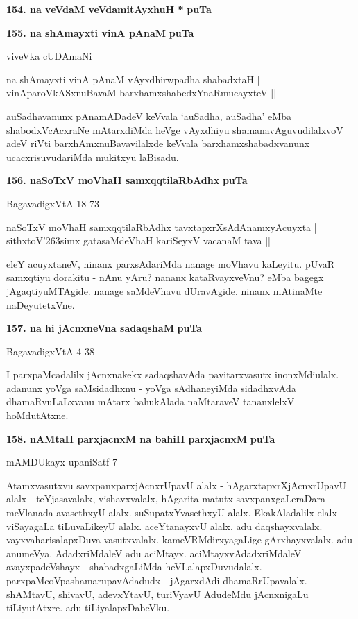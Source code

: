 \medskip
\noindent
\textbf{154. na veVdaM veVdamitAyxhuH *} \hfill{\bf puTa \pageref{132}}

\medskip
\noindent
\textbf{155. na shAmayxti vinA pAnaM} \hfill{\bf puTa \pageref{25}}

\hfill{viveVka cUDAmaNi}

\begin{shloka}
na shAmayxti vinA pAnaM vAyxdhirwpadha shabadxtaH |\\
vinAparoVkASxnuBavaM barxhamxshabedxYnaRmucayxteV ||
\end{shloka}

\smallskip
auSadhavanunx pAnamADadeV keVvala `auSadha, auSadha' eMba shabodxVcAcxraNe mAtarx\-diMda heVge vAyxdhi\-yu\- shamanavAguvudilalxvoV adeV riVti barxhAmxnuBavavilalxde \hbox{keVvala} barxhamxshabadxvanunx ucacxrisuvuda\-riMda mukitxyu laBisadu.

\medskip
\noindent
\textbf{156. naSoTxV moVhaH samxqqtilaRbAdhx} \hfill{\bf puTa \pageref{63}}

\hfill{BagavadigxVtA 18-73}

\begin{shloka}
naSoTxV moVhaH samxqqtilaRbAdhx tavxtapxrXsAdAnamxyAcuyxta |\\
sithxtoV\char'263simx gatasaMdeVhaH kariSeyxV vacanaM tava ||
\end{shloka}

\smallskip
eleY acuyxtaneV, ninanx parxsAdariMda nanage moVhavu kaLeyitu. pUvaR samxqtiyu dorakitu - nAnu yAru? nananx kataRvayxveVnu? eMba bagegx jAgaqtiyuMTAgide. nanage saMdeVhavu dUravAgide. ninanx mAtinaMte naDeyutetxVne.

\medskip
\noindent
\textbf{157. na hi jAcnxneVna sadaqshaM} \hfill{\bf puTa \pageref{21}}

\hfill{BagavadigxVtA 4-38}

\smallskip
I parxpaMcadalilx jAcnxnakekx sadaqshavAda pavitarxvasutx inonxMdiulalx. adanunx yoVga saMsidadhxnu - yoVga sAdhaneyiMda sidadhxvAda dhamaRvuLaLxvanu mAtarx bahukAlada naMtaraveV tananxlelxV hoMdutAtxne.

\medskip
\noindent
\textbf{158. nAMtaH parxjacnxM na bahiH parxjacnxM} \hfill{\bf puTa \pageref{246}}

\hfill{mAMDUkayx upaniSatf 7}

\smallskip
Atamxvasutxvu savxpanxparxjAcnxrUpavU alalx - hAgarxtapxrXjAcnxrUpavU alalx - teYjasavalalx, vishavxvalalx, hAgarita matutx savxpanxgaLeraDara meVlanada avasethxyU alalx. suSupatxYvasethxyU alalx. EkakAladalilx elalx viSayagaLa tiLuvaLikeyU alalx. aceYtanayxvU alalx. adu daqshayxvalalx. vayxvaharisalapxDuva vasutxvalalx. kameVRMdirxya\-gaLige gArxhayxvalalx. adu anumeVya. AdadxriMdaleV adu aciMtayx. aciMtayxvAdadxriMdaleV avayxpadeVshayx - shabadxgaLiMda heVLalapxDuvudalalx. parxpaMcoVpashamarupavAdadudx - jAgarxdAdi dhamaRrUpavalalx. shAMtavU, shivavU, adevxYtavU, turiVyavU AdudeMdu jAcnxnigaLu tiLiyutAtxre. adu tiLiyalapxDabeVku.

